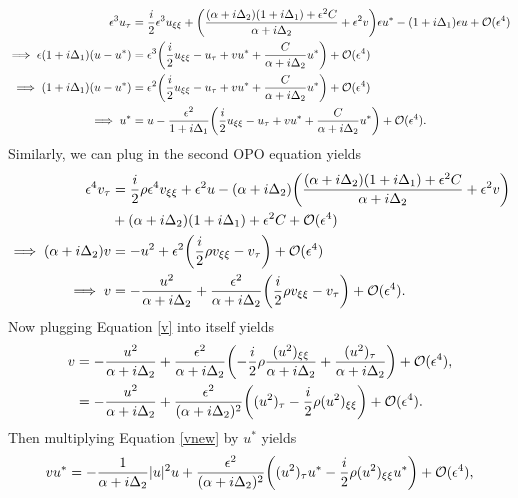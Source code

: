 \documentclass[12pt]{report}
\begin{document}
\begin{solution}
\begin{align}
        {\epsilon}^3 u_\tau &= \frac{i}{2}{\epsilon}^3 u_{\xi \xi} + {\left(\frac{(\alpha + i \Delta_2)(1 + i\Delta_1) + {\epsilon}^2 C}{\alpha + i \Delta_2} + {\epsilon}^2 v\right)}{\epsilon} u^* - (1 + i\Delta_1){\epsilon} u + {\mathcal{O}}({\epsilon}^4) \nonumber \\
        \implies {\epsilon}(1 + i\Delta_1)(u - u^*) &= {\epsilon}^3{\left(\frac{i}{2} u_{\xi \xi} - u_\tau + vu^* + \frac{C}{\alpha + i \Delta_2}u^*\right)} + {\mathcal{O}}({\epsilon}^4) \nonumber \\
        \implies (1 + i\Delta_1)(u - u^*) &= {\epsilon}^2{\left(\frac{i}{2} u_{\xi \xi} - u_\tau + vu^* + \frac{C}{\alpha + i \Delta_2}u^*\right)} + {\mathcal{O}}({\epsilon}^4) \label{bigboi} \\
        \implies u^* &= u - \frac{{\epsilon}^2}{1 + i\Delta_1}{\left(\frac{i}{2}u_{\xi\xi} - u_\tau + vu^* + \frac{C}{\alpha + i \Delta_2}u^*\right)} + {\mathcal{O}}({\epsilon}^4). \label{u}
    \end{align}
    Similarly, we can plug in the second OPO equation yields
    \begin{align}
        {\epsilon}^4 v_\tau &= \frac{i}{2}\rho {\epsilon}^4 v_{\xi \xi} + {\epsilon}^2u -(\alpha + i \Delta_2){\left(\frac{(\alpha + i \Delta_2)(1 + i\Delta_1) + {\epsilon}^2 C}{\alpha + i \Delta_2} + {\epsilon}^2 v\right)}\nonumber \\ &+ (\alpha + i \Delta_2)(1 + i\Delta_1) + {\epsilon}^2 C + {\mathcal{O}}({\epsilon}^4)\nonumber \\
        \implies (\alpha + i\Delta_2)v &= -u^2 + {\epsilon}^2{\left(\frac{i}{2}\rho v_{\xi \xi} - v_\tau\right)} + {\mathcal{O}}({\epsilon}^4) \\
        \implies v &= -\frac{u^2}{\alpha + i \Delta_2} + \frac{{\epsilon}^2}{\alpha + i \Delta_2}{\left(\frac{i}{2}\rho v_{\xi \xi} - v_\tau\right)} + {\mathcal{O}}({\epsilon}^4). \label{v}
    \end{align}
    Now plugging Equation \ref{v} into itself yields
    \begin{align}
        v &= -\frac{u^2}{\alpha + i \Delta_2} + \frac{{\epsilon}^2}{\alpha + i \Delta_2}{\left(-\frac{i}{2}\rho \frac{(u^2)_{\xi \xi}}{\alpha + i \Delta_2} + \frac{(u^2)_\tau}{\alpha + i \Delta_2}\right)} + {\mathcal{O}}({\epsilon}^4),\nonumber \\
        &= -\frac{u^2}{\alpha + i \Delta_2} + \frac{{\epsilon}^2}{(\alpha + i \Delta_2)^2}{\left((u^2)_\tau - \frac{i}{2}\rho(u^2)_{\xi \xi}\right)} + {\mathcal{O}}({\epsilon}^4). \label{vnew}
    \end{align}
    Then multiplying Equation \ref{vnew} by $u^*$ yields
    \begin{align*}
        vu^* = -\frac{1}{\alpha + i \Delta_2}|u|^2u + \frac{{\epsilon}^2}{(\alpha + i \Delta_2)^2}{\left((u^2)_\tau u^* - \frac{i}{2}\rho(u^2)_{\xi \xi}u^*\right)} + {\mathcal{O}}({\epsilon}^4),
    \end{align*}    

\end{solution}
\end{document}
